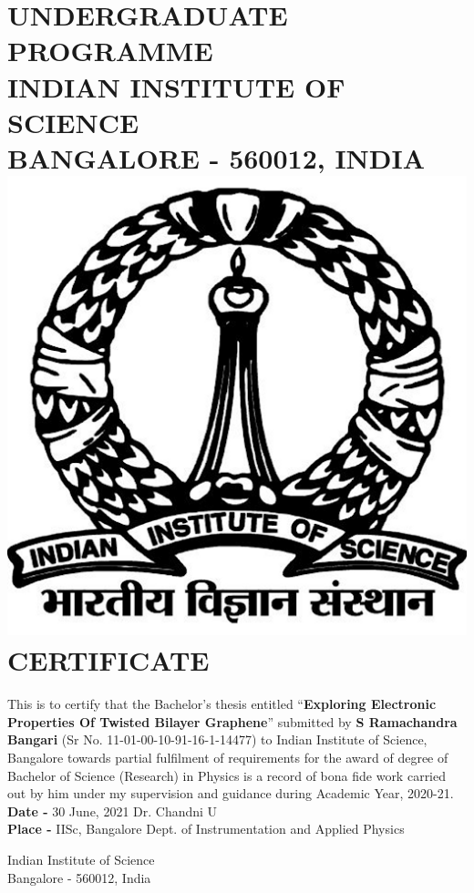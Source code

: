 \cleardoublepage
\section*{\centering 
UNDERGRADUATE PROGRAMME \\
INDIAN INSTITUTE OF SCIENCE \\ 
BANGALORE - 560012, INDIA \\ \vspace{1 cm}
\centering \includegraphics[scale=0.2]{Logo.png} \\
\vspace{1 cm}
\centering CERTIFICATE
}
\vspace{2 cm}
This is to certify that the Bachelor's thesis entitled “\textbf{Exploring Electronic Properties Of Twisted Bilayer Graphene}” submitted by \textbf{S Ramachandra Bangari} (Sr No. 11-01-00-10-91-16-1-14477) to Indian Institute of Science, Bangalore towards partial fulfilment of requirements for the award of degree of Bachelor of Science (Research) in Physics is a record of bona fide work carried out by him under my supervision and guidance during Academic Year, 2020-21.
\vfill
\noindent \textbf{Date -} 30 June, 2021 \hfill Dr. Chandni U \\
\textbf{Place -} IISc, Bangalore \hfill  Dept. of Instrumentation and Applied Physics \begin{flushright}
Indian Institute of Science\\
Bangalore - 560012, India
\end{flushright} 
